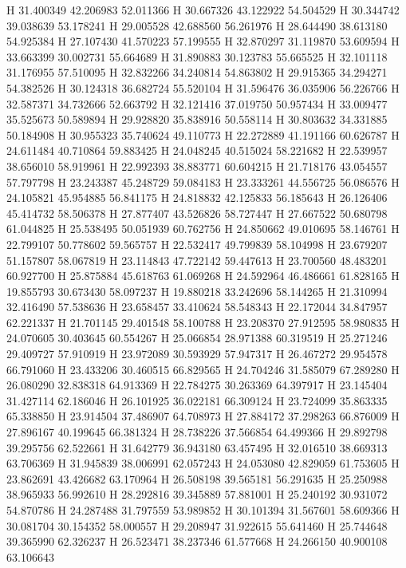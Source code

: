 \documentclass{article}
\begin{document}
H 31.400349 42.206983 52.011366
H 30.667326 43.122922 54.504529
H 30.344742 39.038639 53.178241
H 29.005528 42.688560 56.261976
H 28.644490 38.613180 54.925384
H 27.107430 41.570223 57.199555
H 32.870297 31.119870 53.609594
H 33.663399 30.002731 55.664689
H 31.890883 30.123783 55.665525
H 32.101118 31.176955 57.510095
H 32.832266 34.240814 54.863802
H 29.915365 34.294271 54.382526
H 30.124318 36.682724 55.520104
H 31.596476 36.035906 56.226766
H 32.587371 34.732666 52.663792
H 32.121416 37.019750 50.957434
H 33.009477 35.525673 50.589894
H 29.928820 35.838916 50.558114
H 30.803632 34.331885 50.184908
H 30.955323 35.740624 49.110773
H 22.272889 41.191166 60.626787
H 24.611484 40.710864 59.883425
H 24.048245 40.515024 58.221682
H 22.539957 38.656010 58.919961
H 22.992393 38.883771 60.604215
H 21.718176 43.054557 57.797798
H 23.243387 45.248729 59.084183
H 23.333261 44.556725 56.086576
H 24.105821 45.954885 56.841175
H 24.818832 42.125833 56.185643
H 26.126406 45.414732 58.506378
H 27.877407 43.526826 58.727447
H 27.667522 50.680798 61.044825
H 25.538495 50.051939 60.762756
H 24.850662 49.010695 58.146761
H 22.799107 50.778602 59.565757
H 22.532417 49.799839 58.104998
H 23.679207 51.157807 58.067819
H 23.114843 47.722142 59.447613
H 23.700560 48.483201 60.927700
H 25.875884 45.618763 61.069268
H 24.592964 46.486661 61.828165
H 19.855793 30.673430 58.097237
H 19.880218 33.242696 58.144265
H 21.310994 32.416490 57.538636
H 23.658457 33.410624 58.548343
H 22.172044 34.847957 62.221337
H 21.701145 29.401548 58.100788
H 23.208370 27.912595 58.980835
H 24.070605 30.403645 60.554267
H 25.066854 28.971388 60.319519
H 25.271246 29.409727 57.910919
H 23.972089 30.593929 57.947317
H 26.467272 29.954578 66.791060
H 23.433206 30.460515 66.829565
H 24.704246 31.585079 67.289280
H 26.080290 32.838318 64.913369
H 22.784275 30.263369 64.397917
H 23.145404 31.427114 62.186046
H 26.101925 36.022181 66.309124
H 23.724099 35.863335 65.338850
H 23.914504 37.486907 64.708973
H 27.884172 37.298263 66.876009
H 27.896167 40.199645 66.381324
H 28.738226 37.566854 64.499366
H 29.892798 39.295756 62.522661
H 31.642779 36.943180 63.457495
H 32.016510 38.669313 63.706369
H 31.945839 38.006991 62.057243
H 24.053080 42.829059 61.753605
H 23.862691 43.426682 63.170964
H 26.508198 39.565181 56.291635
H 25.250988 38.965933 56.992610
H 28.292816 39.345889 57.881001
H 25.240192 30.931072 54.870786
H 24.287488 31.797559 53.989852
H 30.101394 31.567601 58.609366
H 30.081704 30.154352 58.000557
H 29.208947 31.922615 55.641460
H 25.744648 39.365990 62.326237
H 26.523471 38.237346 61.577668
H 24.266150 40.900108 63.106643
\end{document}
